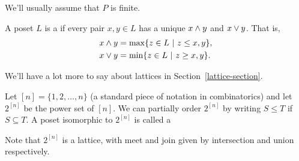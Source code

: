 We'll usually assume that $P$ is finite.


\begin{definition} A poset $L$ is a  if every pair $x,y\in L$
has a unique  $x\wedge y$ and  $x\vee y$.  That is,
  \begin{align*}
  x\wedge y &= \max\{z\in L ~|~ z\leq x,y\},\\
  x\vee y &= \min\{z\in L ~|~ z\geq x,y\}.
  \end{align*}
\end{definition}
We'll have a lot more to say about lattices in Section~\ref{lattice-section}.

\begin{example}
Let $[n]=\{1,2,\dots,n\}$ (a standard piece of notation in combinatorics)
and let $2^{[n]}$ be the power set of $[n]$.  We can partially order $2^{[n]}$ by
writing $S\leq T$ if $S\subseteq T$.  A poset isomorphic to $2^{[n]}$ is called a 

Note that $2^{[n]}$ is a lattice, with meet and join given by intersection and union respectively.
\end{example}


